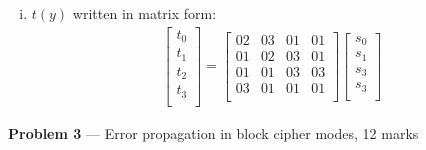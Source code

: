 \documentclass[11pt]{article}
\theoremstyle{definition}
\begin{document}
\begin{enumerate}[a. ]
\begin{enumerate}[i. ]
      \item
        $t(y)$ written in matrix form:
        \begin{align*}
          \begin{bmatrix}
            t_0 \\
            t_1 \\
            t_2 \\
            t_3 \\
          \end{bmatrix} = 
          \begin{bmatrix}
            02 & 03 & 01 & 01 \\
            01 & 02 & 03 & 01 \\
            01 & 01 & 03 & 03 \\
            03 & 01 & 01 & 01 \\
          \end{bmatrix}
          \begin{bmatrix}
            s_0 \\
            s_1 \\
            s_3 \\
            s_3 \\
          \end{bmatrix}
        \end{align*}
    \end{enumerate}
\end{enumerate}

\newpage

\item[] \textbf{Problem 3} --- Error propagation in block cipher modes, 12 marks
\end{document}

